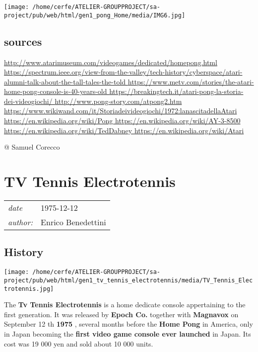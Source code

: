 \documentclass[a4paper,10pt]{book}
\newcommand{\pageHeader}[4]{
    \section{#1}
    \vspace{-0.3cm}
    \begin{table}[h!]
     \begin{tabular}{ll}
        \hline
        \textit{date} & #2 \\
        \textit{author: } & #3\\
        \hline
     \end{tabular}
    \end{table}
    \vspace{-0.3cm}
}
\begin{document}
 
 \texttt{[image: /home/cerfe/ATELIER-GROUPPROJECT/sa-project/pub/web/html/gen1\_pong\_Home/media/IMG6.jpg]}
 
 
 \subsection{sources }
 
 \href{http://www.atarimuseum.com/videogames/dedicated/homepong.html}{http://www.atarimuseum.com/videogames/dedicated/homepong.html }
 \href{https://spectrum.ieee.org/view-from-the-valley/tech-history/cyberspace/atari-alumni-talk-about-the-tall-tales-the-told}{https://spectrum.ieee.org/view-from-the-valley/tech-history/cyberspace/atari-alumni-talk-about-the-tall-tales-the-told }
 \href{https://www.metv.com/stories/the-atari-home-pong-console-is-40-years-old}{https://www.metv.com/stories/the-atari-home-pong-console-is-40-years-old }
 \href{https://breakingtech.it/atari-pong-la-storia-dei-videogiochi/}{https://breakingtech.it/atari-pong-la-storia-dei-videogiochi/ }
 \href{http://www.pong-story.com/atpong2.htm}{http://www.pong-story.com/atpong2.htm }
 \href{https://www.wikiwand.com/it/Storia_dei_videogiochi#/1972:_la_nascita_della_Atari}{https://www.wikiwand.com/it/Storiadeivideogiochi/1972:lanascitadellaAtari }
 \href{https://en.wikipedia.org/wiki/Pong}{https://en.wikipedia.org/wiki/Pong }
 \href{https://en.wikipedia.org/wiki/AY-3-8500}{https://en.wikipedia.org/wiki/AY-3-8500 }
 \href{https://en.wikipedia.org/wiki/Ted_Dabney}{https://en.wikipedia.org/wiki/TedDabney }
 \href{https://en.wikipedia.org/wiki/Atari}{https://en.wikipedia.org/wiki/Atari }
 
 
 @ Samuel Corecco 
 
 \newpage\pageHeader{TV Tennis Electrotennis}{1975-12-12}{Enrico Benedettini}{The first japanese home console ever.}
 \subsection{History }
 \texttt{[image: /home/cerfe/ATELIER-GROUPPROJECT/sa-project/pub/web/html/gen1\_tv\_tennis\_electrotennis/media/TV\_Tennis\_Electrotennis.jpg]}
 
          The  \textbf{Tv Tennis Electrotennis }  is a home dedicate console appertaining to the first generation.
          It was released by  \textbf{Epoch Co. }  together with  \textbf{Magnavox }  on  September 12 th 
 \textbf{1975 } , several months before the  \textbf{Home Pong }  in America, only in Japan becoming
          the  \textbf{first video game console ever launched }  in Japan.  
          Its cost was 19 000 yen and sold about 10 000 units.
         
\end{document}
